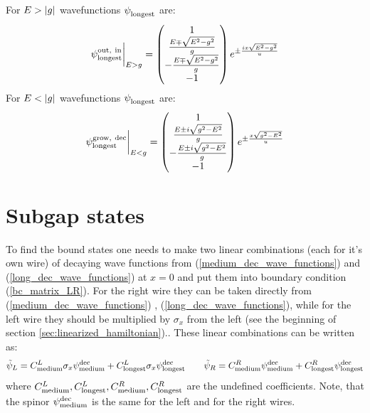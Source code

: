 For $ E>\left|g\right| $ wavefunctions $ \psi_{\mathrm{longest}}^{\mathrm{}}$ are:
\begin{gather}
\label{long_prop_wave_functions}
		\psi_{\mathrm{longest}}^{\mathrm{out,~in}}
		\bigg|_{E>g}
=
\begin{pmatrix}
1\\
\frac{E\mp \sqrt{E^2-g^2}}{g}\\
-\frac{E\mp \sqrt{E^2-g^2}}{g}\\
-1
\end{pmatrix}
e^{\pm\frac{ix\sqrt{E^2-g^2}}{u}}
\end{gather}
For $ E<\left|g\right| $ wavefunctions $ \psi_{\mathrm{longest}}^{\mathrm{}}	 $ are:
\begin{gather}
	\label{long_dec_wave_functions}
	\psi_{\mathrm{longest}}^{\mathrm{grow,~dec}} 
	\bigg|_{E<g}
	=
	\begin{pmatrix}
	1\\
	\frac{E\pm i\sqrt{g^2-E^2}}{g}\\
	-\frac{E\pm i\sqrt{g^2-E^2}}{g}\\
	-1
	\end{pmatrix}
	e^{\pm\frac{x\sqrt{g^2-E^2}}{u}}
\end{gather}

\section{Subgap states}
\label{sec:Subgap_states}

To find the bound states one needs to make two linear combinations (each for it's own wire) of decaying wave functions from (\ref{medium_dec_wave_functions}) and (\ref{long_dec_wave_functions}) at $ x=0 $ and put them into boundary condition (\ref{bc_matrix_LR}). For the right wire they can be taken directly from (\ref{medium_dec_wave_functions}) , (\ref{long_dec_wave_functions}), while for the left wire they should be multiplied by $ \sigma_x $ from the left (see the beginning of section \ref{sec:linearized_hamiltonian}).. These linear combinations can be written as:
\begin{gather}
	\tilde{\psi}_L
	=
	C_{\mathrm{medium}}^L
	\sigma_x 
	\psi_{\mathrm{medium}}^{\mathrm{dec}} 
	+
	C_{\mathrm{longest}}^L
	\sigma_x
	 \psi_{\mathrm{longest}}^{\mathrm{dec}} 
\qquad
	\tilde{\psi}_R
	=
	C_{\mathrm{medium}}^R
	\psi_{\mathrm{medium}}^{\mathrm{dec}} 
	+
	C_{\mathrm{longest}}^R
	\psi_{\mathrm{longest}}^{\mathrm{dec}} 
\end{gather}
where $ C_{\mathrm{medium}}^L,C_{\mathrm{longest}}^L, C_{\mathrm{medium}}^R,C_{\mathrm{longest}}^R $ are the undefined coefficients. Note, that the spinor $ \psi_{\mathrm{medium}}^{\mathrm{dec}} $ is the same for the left and for the right wires.

